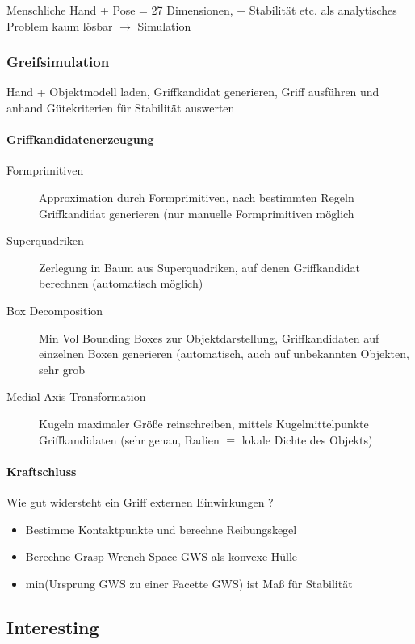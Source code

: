 Menschliche Hand + Pose = 27 Dimensionen, + Stabilität etc. als analytisches Problem kaum lösbar $\rightarrow$ Simulation

\subsubsection{Greifsimulation}

Hand + Objektmodell laden, Griffkandidat generieren, Griff ausführen und anhand Gütekriterien für Stabilität auswerten

\paragraph{Griffkandidatenerzeugung}

\begin{description}
	\item[Formprimitiven] Approximation durch Formprimitiven, nach bestimmten Regeln Griffkandidat generieren (nur manuelle Formprimitiven möglich
	\item[Superquadriken] Zerlegung in Baum aus Superquadriken, auf denen Griffkandidat berechnen (automatisch möglich)
	\item[Box Decomposition] Min Vol Bounding Boxes zur Objektdarstellung, Griffkandidaten auf einzelnen Boxen generieren (automatisch, auch auf unbekannten Objekten, sehr grob
	\item[Medial-Axis-Transformation] Kugeln maximaler Größe reinschreiben, mittels Kugelmittelpunkte Griffkandidaten (sehr genau, Radien $\equiv$ lokale Dichte des Objekts)
\end{description}

\paragraph{Kraftschluss}

Wie gut widersteht ein Griff externen Einwirkungen ? \\

\begin{itemize}
	\item Bestimme Kontaktpunkte und berechne Reibungskegel
	\item Berechne Grasp Wrench Space GWS als konvexe Hülle
	\item min(Ursprung GWS zu einer Facette GWS) ist Maß für Stabilität
\end{itemize}

\subsection{Interesting}

